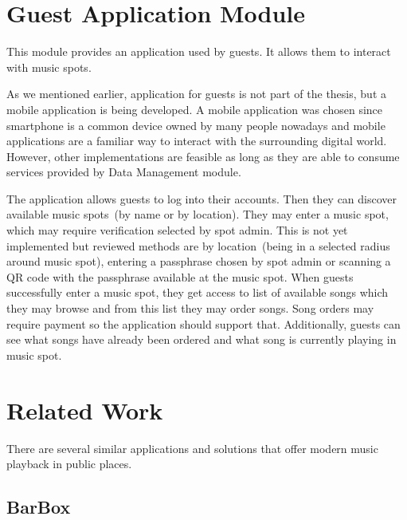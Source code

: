\section{Guest Application Module}

This module provides an application used by guests. It allows them to interact with music spots.
\par
As we mentioned earlier, application for guests is not part of the thesis, but a mobile application is being developed. A mobile application was chosen since smartphone is a common device owned by many people nowadays and mobile applications are a familiar way to interact with the surrounding digital world. However, other implementations are feasible as long as they are able to consume services provided by Data Management module.
\par
The application allows guests to log into their accounts. Then they can discover available music spots~(by name or by location). They may enter a music spot, which may require verification selected by spot admin. This is not yet implemented but reviewed methods are by location~(being in a selected radius around music spot), entering a passphrase chosen by spot admin or scanning a QR code with the passphrase available at the music spot. When guests successfully enter a music spot, they get access to list of available songs which they may browse and from this list they may order songs. Song orders may require payment so the application should support that. Additionally, guests can see what songs have already been ordered and what song is currently playing in music spot.

\section{Related Work}

There are several similar applications and solutions that offer modern music playback in public places.

\subsection{BarBox}

